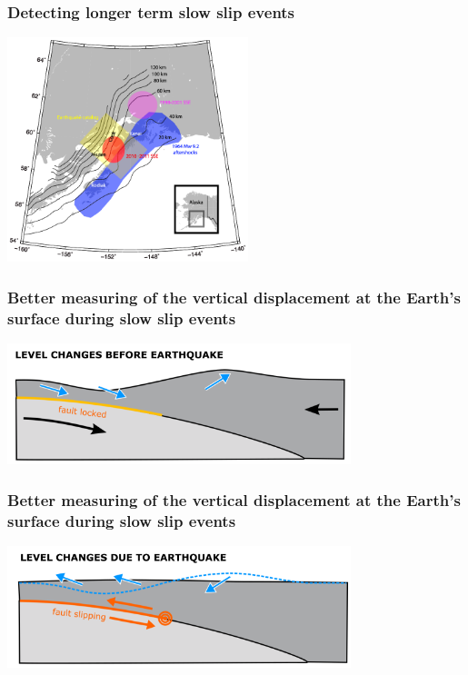 \documentclass{beamer}
\begin{document}
	\begin{frame}
		\frametitle{Detecting longer term slow slip events}
		\begin{center}
			\includegraphics[trim={0cm 0cm 0cm 0cm}, clip, width=7cm]{articles/wei_al_2012_1.png}
		\end{center}
	\end{frame}

	\begin{frame}
		\frametitle{Better measuring of the vertical displacement at the Earth’s surface during slow slip events}
		\begin{center}
			\includegraphics[trim={0cm 0cm 0cm 0cm}, clip, width=10cm]{slowslip/Prequake_level_changes_shallow_thrust.png}
		\end{center}
	\end{frame}

	\begin{frame}
		\frametitle{Better measuring of the vertical displacement at the Earth’s surface during slow slip events}
		\begin{center}
			\includegraphics[trim={0cm 0cm 0cm 0cm}, clip, width=10cm]{slowslip/Postquake_level_changes_shallow_thrust.png}
		\end{center}
	\end{frame}
\end{document}
